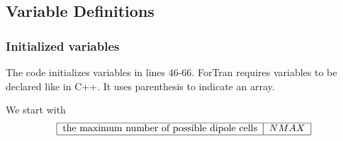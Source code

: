 \documentclass{article}
\begin{document}
\subsection{Variable Definitions}

\subsubsection{Initialized variables}

The code initializes variables in lines 46-66. ForTran requires variables to
be declared like in C++. It uses parenthesis to indicate an array.

We start with 
\[
\begin{tabular}{|l|l|}
\hline
the maximum number of possible dipole cells & $NMAX$ \\ \hline
\end{tabular}%
\]
\end{document}
